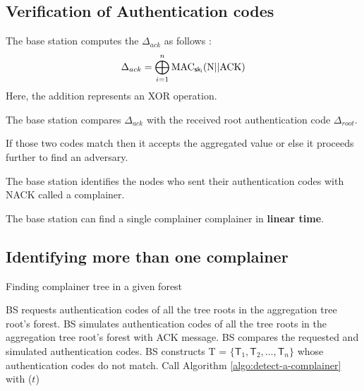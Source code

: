 \documentclass[%
  slidesonly,%
  semlayer%
  ]{seminar}                                  %
\newcommand{\sk}{\sf{sk}}
\begin{document}
\begin{slide}
      \subsection*{Verification of Authentication codes}
        \vfill
        The base station computes the $\Delta_{ack}$ as follows :
        \begin{equation*}
          \displaystyle{\Delta_{ack} = \bigoplus_{i = 1}^n \mbox{MAC}_{\sk_{i}}(\mbox{N} || \mbox{ACK}) }
        \end{equation*}
        Here, the addition represents an XOR operation.

        The base station compares   $\Delta_{ack}$ with the received root authentication code $\Delta_{root}$. 
        
        If those two codes match then it accepts the aggregated value or else it proceeds further to find an adversary. 

        The base station identifies the nodes who sent their authentication codes with NACK called a complainer. 
        
        The base station can find a single complainer complainer in \textbf{linear time}.

        \vfill
        \clearpage

      \subsection*{Identifying more than one complainer}
        \vfill
        
        \begin{algorithm}
          \caption{Finding complainer tree in a given forest}
          \label{algo:detect-a-complainer-tree}
          \begin{algorithmic}[1]
            \STATE BS requests authentication codes of all the tree roots in the aggregation tree root's forest.
            \STATE BS simulates authentication codes of all the tree roots in the aggregation tree root's forest with ACK message.
            \STATE BS compares the requested and simulated authentication codes.
            \STATE BS constructs \textsf{T} = $\{\textsf{T}_{1},\textsf{T}_{2},\dotsc,\textsf{T}_{n}\}$ whose authentication codes do not match.
              \STATE Call Algorithm \ref{algo:detect-a-complainer} with ($t$)     
            \ENDFOR 
          \end{algorithmic}
        \end{algorithm}


\end{slide}
\end{document}
